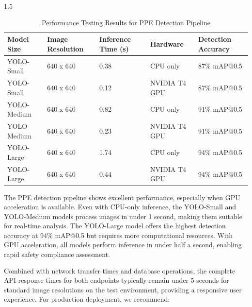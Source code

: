 \documentclass[12pt,a4paper]{report}
\begin{document}
\begin{spacing}{1.5}
    \begin{table}[H]
        \centering
        \caption{Performance Testing Results for PPE Detection Pipeline}
        \label{tab:ppe_perf}
        \begin{tabular}{|p{2.5cm}|p{2cm}|p{3cm}|p{2.5cm}|p{3.5cm}|}
            \hline
            \textbf{Model Size} & \textbf{Image Resolution} & \textbf{Inference Time (s)} & \textbf{Hardware} & \textbf{Detection Accuracy} \\
            \hline
            YOLO-Small          & 640 x 640                 & 0.38                        & CPU only          & 87\% mAP@0.5                \\
            \hline
            YOLO-Small          & 640 x 640                 & 0.12                        & NVIDIA T4 GPU     & 87\% mAP@0.5                \\
            \hline
            YOLO-Medium         & 640 x 640                 & 0.82                        & CPU only          & 91\% mAP@0.5                \\
            \hline
            YOLO-Medium         & 640 x 640                 & 0.23                        & NVIDIA T4 GPU     & 91\% mAP@0.5                \\
            \hline
            YOLO-Large          & 640 x 640                 & 1.74                        & CPU only          & 94\% mAP@0.5                \\
            \hline
            YOLO-Large          & 640 x 640                 & 0.44                        & NVIDIA T4 GPU     & 94\% mAP@0.5                \\
            \hline
        \end{tabular}
    \end{table}

    The PPE detection pipeline shows excellent performance, especially when GPU acceleration is available. Even with CPU-only inference, the YOLO-Small and YOLO-Medium models process images in under 1 second, making them suitable for real-time analysis. The YOLO-Large model offers the highest detection accuracy at 94\% mAP@0.5 but requires more computational resources. With GPU acceleration, all models perform inference in under half a second, enabling rapid safety compliance assessment.

    Combined with network transfer times and database operations, the complete API response times for both endpoints typically remain under 5 seconds for standard image resolutions on the test environment, providing a responsive user experience. For production deployment, we recommend:


\end{spacing}
\end{document}
